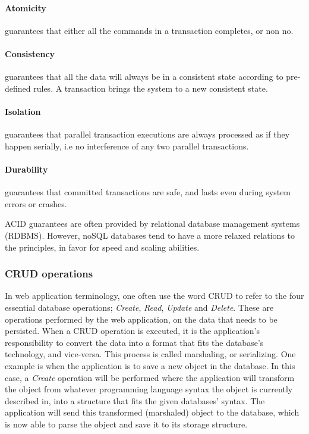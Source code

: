 \paragraph{Atomicity} guarantees that either all the commands in a transaction completes, or non no.
\paragraph{Consistency} guarantees that all the data will always be in a consistent state according to pre-defined rules. A transaction brings the system to a new consistent state.
\paragraph{Isolation} guarantees that parallel transaction executions are always processed as if they happen serially, i.e no interference of any two parallel transactions. 
\paragraph{Durability} guarantees that committed transactions are safe, and lasts even during system errors or crashes. 

ACID guarantees are often provided by relational database management systems (RDBMS). However, noSQL databases tend to have a more relaxed relations to the principles, in favor for speed and scaling abilities. 

\subsubsection{CRUD operations}
In web application terminology, one often use the word CRUD to refer to the four essential  database operations; \textit{Create}, \textit{Read}, \textit{Update} and \textit{Delete}. These are operations performed by the web application, on the data that needs to be persisted. When a CRUD operation is executed, it is the application's responsibility to convert the data into a format that fits the database's technology, and vice-versa. This process is called marshaling, or serializing. One example is when the application is to save a new object in the database. In this case, a \textit{Create} operation will be performed where the application will transform the object from whatever programming language syntax the object is currently described in, into a structure that fits the given databases' syntax. The application will send this transformed (marshaled) object to the database, which is now able to parse the object and save it to its storage structure.   

